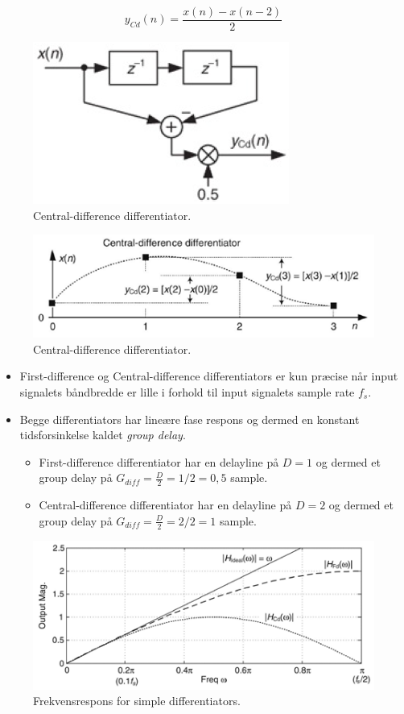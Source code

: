 \documentclass[danish]{article}
\begin{document}
\begin{equation}
y_{Cd}(n) = \frac{x(n)-x(n-2)}{2}
\end{equation}

\begin{figure}[H]
	\centering
	\includegraphics[width=0.3\linewidth]{graphics/central-difference-differentiator}
	\caption{Central-difference differentiator.}
	\label{fig:central-difference-differentiator}
\end{figure}

\begin{figure}[H]
	\centering
	\includegraphics[width=0.6\linewidth]{graphics/central-difference-differentiator1}
	\caption{Central-difference differentiator.}
	\label{fig:central-difference-differentiator1}
\end{figure}

\begin{itemize}
	\item First-difference og Central-difference differentiators er kun præcise når input signalets båndbredde er lille i forhold til input signalets sample rate $f_s$. 
	\item Begge	differentiators har lineære fase respons og dermed en konstant tidsforsinkelse kaldet \textit{group delay}.
	\begin{itemize}
		\item First-difference differentiator har en delayline på $D = 1$ og dermed et group delay på \newline $G_{diff}= \frac{D}{2} = 1/2 = 0,5$ sample.
		\item Central-difference differentiator har en delayline på $D = 2$ og dermed et group delay på $G_{diff}= \frac{D}{2} = 2/2 = 1$ sample.
	\end{itemize}
\end{itemize}

\begin{figure}[H]
	\centering
	\includegraphics[width=0.6\linewidth]{graphics/frekvensrespons_diff}
	\caption{Frekvensrespons for simple differentiators.}
	\label{fig:frekvensrespons_diff}
\end{figure}
\end{document}
